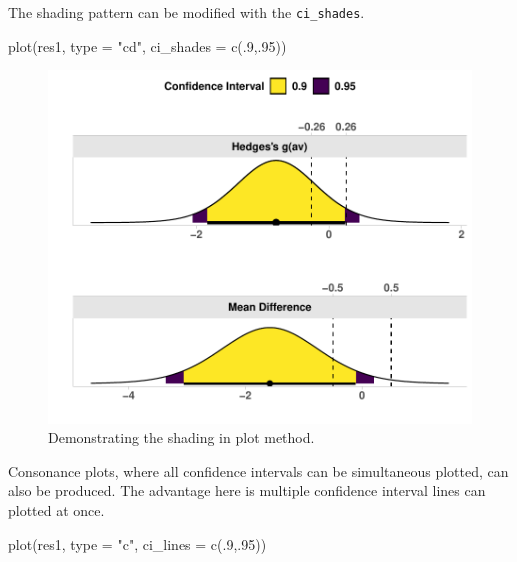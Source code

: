 \documentclass[]{interact}
\theoremstyle{plain}%
\theoremstyle{definition}
\theoremstyle{remark}
\newenvironment{Shaded}{\begin{snugshade}}{\end{snugshade}}
\newcommand{\AttributeTok}[1]{\textcolor[rgb]{0.77,0.63,0.00}{#1}}
\newcommand{\DecValTok}[1]{\textcolor[rgb]{0.00,0.00,0.81}{#1}}
\newcommand{\FunctionTok}[1]{\textcolor[rgb]{0.00,0.00,0.00}{#1}}
\newcommand{\NormalTok}[1]{#1}
\newcommand{\StringTok}[1]{\textcolor[rgb]{0.31,0.60,0.02}{#1}}
\begin{document}
\newpage

The shading pattern can be modified with the \texttt{ci\_shades}.

\begin{Shaded}
\begin{Highlighting}[]
\FunctionTok{plot}\NormalTok{(res1, }\AttributeTok{type =} \StringTok{"cd"}\NormalTok{,}
     \AttributeTok{ci\_shades =} \FunctionTok{c}\NormalTok{(.}\DecValTok{9}\NormalTok{,.}\DecValTok{95}\NormalTok{))}
\end{Highlighting}
\end{Shaded}

\begin{figure}
\centering
\includegraphics{Avocado_Update_files/figure-latex/shadeplot-1.pdf}
\caption{Demonstrating the shading in plot method.}
\end{figure}

\newpage

Consonance plots, where all confidence intervals can be simultaneous
plotted, can also be produced. The advantage here is multiple confidence
interval lines can plotted at once.

\begin{Shaded}
\begin{Highlighting}[]
\FunctionTok{plot}\NormalTok{(res1, }\AttributeTok{type =} \StringTok{"c"}\NormalTok{,}
     \AttributeTok{ci\_lines =}  \FunctionTok{c}\NormalTok{(.}\DecValTok{9}\NormalTok{,.}\DecValTok{95}\NormalTok{))}
\end{Highlighting}
\end{Shaded}
\end{document}
